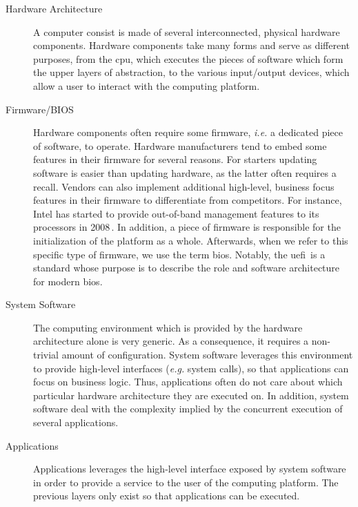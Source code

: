 \begin{description}
\item [Hardware Architecture]
  A computer consist is made of several inter\-connected, physical hardware
  components.
  Hardware components take many forms and serve as different purposes, from the
  \ac{cpu}, which executes the pieces of software which form the upper layers of
  abstraction, to the various input/output devices, which allow a user to
  interact with the computing platform.
\item [Firmware/BIOS]
  Hardware components often require some firm\-ware, \emph{i.e.} a dedicated
  piece of software, to operate.
  Hardware manufacturers tend to embed some features in their firmware for
  several reasons.
  For starters updating software is easier than updating hardware, as the latter
  often requires a recall.
  Vendors can also implement additional high-level, business focus features in
  their firmware to differentiate from competitors.
  For instance, Intel has started to provide out-of-band management features to
  its processors in 2008\,\cite{ruan2014me}.
  In addition, a piece of firmware is responsible for the initialization of the
  platform as a whole.
  Afterwards, when we refer to this specific type of firmware, we use the term
  \ac{bios}.
  Notably, the \ac{uefi}\,\cite{uefi2017uefi} is a standard whose purpose is to
  describe the role and software architecture for modern \ac{bios}.
\item [System Software]
  The computing environment which is provided by the hardware architecture alone
  is very generic.
  As a consequence, it requires a non-trivial amount of configuration.
  System software leverages this environment to provide high-level interfaces
  (\emph{e.g.} system calls), so that applications can focus on business
  logic. Thus, applications often do not care about which particular hardware
  architecture they are executed on.
  In addition, system software deal with the complexity implied by the
  concurrent execution of several applications.
\item [Applications]
  Applications leverages the high-level interface exposed by system software in
  order to provide a service to the user of the computing platform.
  The previous layers only exist so that applications can be executed.
\end{description}

